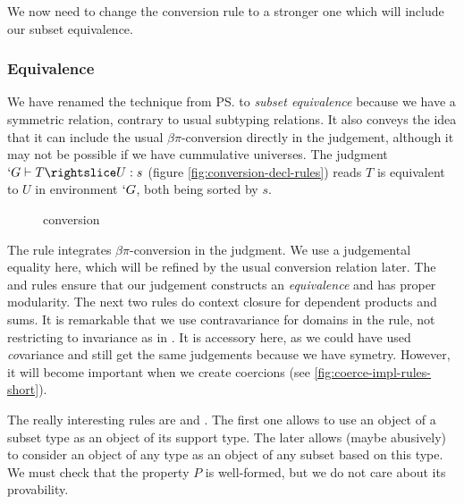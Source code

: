 \documentclass{llncs}
\begin{document}
We now need to change the conversion rule to a stronger one which will
include our subset equivalence.

\subsubsection{Equivalence}
We have renamed the technique from \ps{} to 
\emph{subset equivalence} because we have a symmetric relation, contrary
to usual subtyping relations. It also conveys the idea that it can
include the usual $\beta\pi$-conversion directly in the judgement, 
although it may not be possible if we have cummulative universes.
The judgment $`G \typed T \subd{} U : s$ (figure
\vref{fig:conversion-decl-rules}) reads $T$ is equivalent to $U$ in
environment $`G$, both being sorted by $s$. 

\begin{figure}[h]
  \subtdRules
  \caption{\Russell{} conversion}
  \label{fig:conversion-decl-rules}
\end{figure}

The rule  integrates $\beta\pi$-conversion in the
judgment. We use a judgemental equality here, which will be refined by
the usual conversion relation later. The  and
 rules ensure that our judgement constructs an \emph{equivalence} and has
proper modularity. The next two rules do context closure for dependent
products and sums. It is remarkable that we use contravariance
\cite{journals/toplas/Castagna95} for
domains in the  rule, not restricting to invariance as in
\PVS. It is accessory here, as we could have used \emph{co}variance and
still get the same judgements because we have symetry. However, it will
become important when we create coercions (see
\vref{fig:coerce-impl-rules-short}).

The really interesting rules are  and
. The first one allows to use an object of a subset type
as an object of its support type. The later allows (maybe abusively) to
consider an object of any type as an object of any subset based on
this type. We must check that the property $P$ is well-formed, but
we do not care about its provability.
\end{document}
